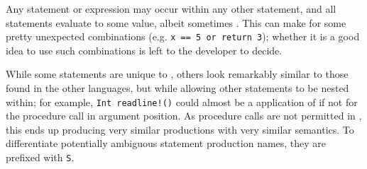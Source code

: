 Any statement or expression may occur within any other statement, and
all statements evaluate to some value, albeit sometimes .
This can make for some pretty unexpected combinations
(e.g. \texttt{x == 5 or return 3}); whether it is a good idea to use
such combinations is left to the developer to decide.

While some statements are unique to \Prose{}, others look remarkably similar
to those found in the other languages, but while allowing other statements
to be nested within; for example, \texttt{Int readline!()} could almost be
a \Poetry{} application of  if not for the procedure call in argument
position. As procedure calls are not permitted in \Poetry{}, this ends up
producing very similar productions with very similar semantics. To
differentiate potentially ambiguous statement production names, they
are prefixed with \texttt{S}.

\begin{bnf*}
     \\
     \\
     \\
     \\
     \\
     \\
     \\
     \\
     \\
     \\
\end{bnf*}

